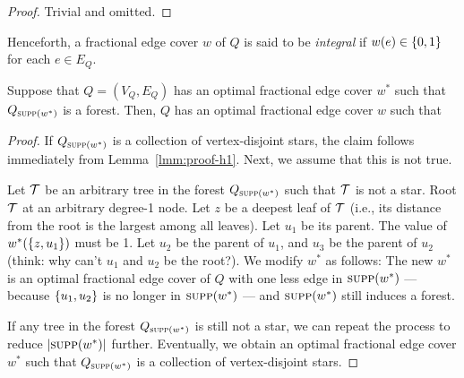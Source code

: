 \begin{proof}
   Trivial and omitted.
\end{proof}

Henceforth, a fractional edge cover $w$ of $Q$ is said to be {\em integral} if $w(e) \in \{0, 1\}$ for each $e \in E_Q$.


\begin{lemma} \label{lmm:proof-h2}
   Suppose that $Q = (V_Q, E_Q)$ has an optimal fractional edge cover $w^*$ such that $Q_{\textsc{supp}(w^*)}$ is a forest. Then, $Q$ has an optimal fractional edge cover $w$ such that
\end{lemma}

\begin{proof}

    If $Q_{\textsc{supp}(w^*)}$ is a collection of vertex-disjoint stars, the claim follows immediately from Lemma~\ref{lmm:proof-h1}. Next, we assume that this is not true.

    \vgap



    Let $\mathcal{T}$ be an arbitrary tree in the forest $Q_{\textsc{supp}(w^*)}$ such that $\mathcal{T}$ is not a star. Root $\mathcal{T}$ at an arbitrary degree-1 node. Let $z$ be a deepest leaf of $\mathcal{T}$ (i.e., its distance from the root is the largest among all leaves). Let $u_1$ be its parent. The value of $w^*(\{z, u_1\})$ must be 1. Let $u_2$ be the parent of $u_1$, and $u_3$ be the parent of $u_2$ (think: why can't $u_1$ and $u_2$ be the root?). We modify $w^*$ as follows:
    The new $w^*$ is an optimal fractional edge cover of $Q$
    with one less edge in $\textsc{supp}(w^*)$ --- because $\{u_1, u_2\}$ is no longer in $\textsc{supp}(w^*)$ --- and $\textsc{supp}(w^*)$ still induces a forest.

    \vgap

    If any tree in the forest $Q_{\textsc{supp}(w^*)}$ is still not a star, we can repeat the process to reduce $|\textsc{supp}(w^*)|$ further. Eventually, we obtain an optimal fractional edge cover $w^*$ such that $Q_{\textsc{supp}(w^*)}$ is a collection of vertex-disjoint stars.
\end{proof}


